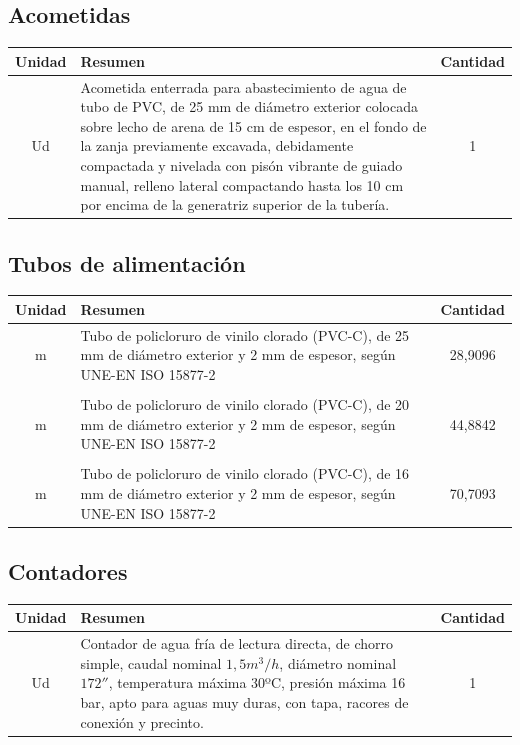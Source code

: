 \documentclass[../main.tex]{subfiles}
\begin{document}
\subsection{Acometidas}
\begin{table}[H]
    \centering
    \begin{tabular}{c p{11.5cm} c}
         Unidad & Resumen & Cantidad  \\ \hline
         Ud & Acometida enterrada para abastecimiento de agua de tubo de PVC, de  25 mm de diámetro exterior colocada sobre lecho de arena de 15 cm de espesor, en el fondo de la zanja previamente excavada, debidamente compactada y nivelada con pisón vibrante de guiado manual, relleno lateral compactando hasta los 10 cm por encima de la generatriz superior de la tubería. & 1 \\
    \end{tabular}
\end{table}

\subsection{Tubos de alimentación}
\begin{table}[H]
    \centering
    \begin{tabular}{c p{11.5cm} c}
         Unidad & Resumen & Cantidad  \\ \hline
         m & Tubo de policloruro de vinilo clorado (PVC-C), de 25 mm de diámetro exterior y 2 mm de espesor, según UNE-EN ISO 15877-2 & 28,9096 \\
         \\
         m & Tubo de policloruro de vinilo clorado (PVC-C), de 20 mm de diámetro exterior y 2 mm de espesor, según UNE-EN ISO 15877-2 & 44,8842 \\
         \\
         m & Tubo de policloruro de vinilo clorado (PVC-C), de 16 mm de diámetro exterior y 2 mm de espesor, según UNE-EN ISO 15877-2 & 70,7093 \\
    \end{tabular}
\end{table}

\subsection{Contadores}
\begin{table}[H]
    \centering
    \begin{tabular}{c p{11.5cm} c}
         Unidad & Resumen & Cantidad  \\ \hline
         Ud & Contador de agua fría de lectura directa, de chorro simple, caudal nominal $1,5 m^3/h$, diámetro nominal $172''$, temperatura máxima 30ºC, presión máxima 16 bar, apto para aguas muy duras, con tapa, racores de conexión y precinto. & 1 \\
    \end{tabular}
\end{table}
\end{document}
